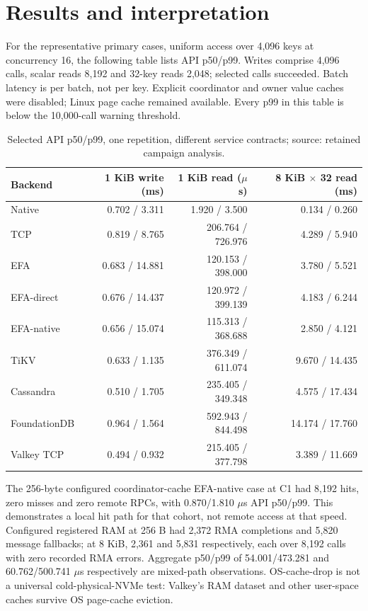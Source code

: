 \documentclass[11pt,a4paper]{article}
\begin{document}
\section{Results and interpretation}\label{sec:results}
For the representative primary cases, uniform access over 4,096 keys at concurrency 16, the following table lists API p50/p99. Writes comprise 4,096 calls, scalar reads 8,192 and 32-key reads 2,048; selected calls succeeded. Batch latency is per batch, not per key. Explicit coordinator and owner value caches were disabled; Linux page cache remained available. Every p99 in this table is below the 10,000-call warning threshold.
\begin{table}[htbp]\centering\small
\begin{tabular}{lrrr}\toprule
Backend & 1 KiB write (ms) & 1 KiB read ($\mu$s) & 8 KiB $\times$ 32 read (ms)\\\midrule
Native & 0.702 / 3.311 & 1.920 / 3.500 & 0.134 / 0.260\\
TCP & 0.819 / 8.765 & 206.764 / 726.976 & 4.289 / 5.940\\
EFA & 0.683 / 14.881 & 120.153 / 398.000 & 3.780 / 5.521\\
EFA-direct & 0.676 / 14.437 & 120.972 / 399.139 & 4.183 / 6.244\\
EFA-native & 0.656 / 15.074 & 115.313 / 368.688 & 2.850 / 4.121\\
TiKV & 0.633 / 1.135 & 376.349 / 611.074 & 9.670 / 14.435\\
Cassandra & 0.510 / 1.705 & 235.405 / 349.348 & 4.575 / 17.434\\
FoundationDB & 0.964 / 1.564 & 592.943 / 844.498 & 14.174 / 17.760\\
Valkey TCP & 0.494 / 0.932 & 215.405 / 377.798 & 3.389 / 11.669\\\bottomrule
\end{tabular}
\caption{Selected API p50/p99, one repetition, different service contracts; source: retained campaign analysis.}\label{tab:representative}\end{table}

The 256-byte configured coordinator-cache EFA-native case at C1 had 8,192 hits, zero misses and zero remote RPCs, with 0.870/1.810 $\mu$s API p50/p99. This demonstrates a local hit path for that cohort, not remote access at that speed. Configured registered RAM at 256 B had 2,372 RMA completions and 5,820 message fallbacks; at 8 KiB, 2,361 and 5,831 respectively, each over 8,192 calls with zero recorded RMA errors. Aggregate p50/p99 of 54.001/473.281 and 60.762/500.741 $\mu$s respectively are mixed-path observations. OS-cache-drop is not a universal cold-physical-NVMe test: Valkey's RAM dataset and other user-space caches survive OS page-cache eviction.
\end{document}
